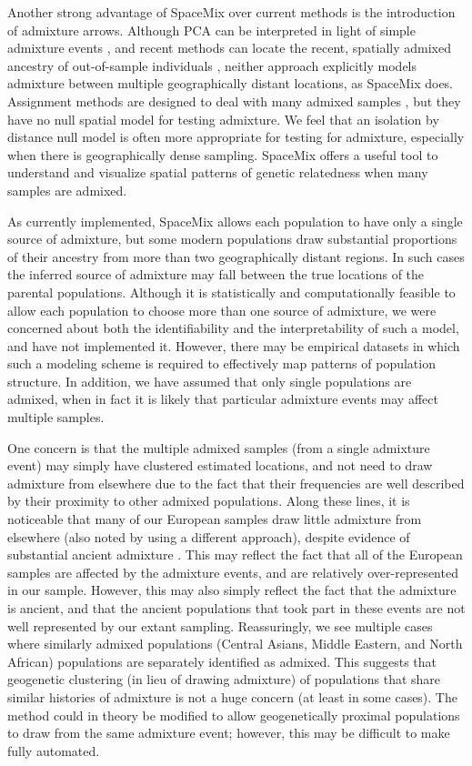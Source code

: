 \documentclass[10pt,letterpaper]{article}
\begin{document}
Another strong advantage of SpaceMix over current methods is the introduction of admixture arrows. 
Although PCA can be interpreted in light of simple admixture events \cite{mcvean_genealogical_2009}, 
and recent methods can locate the recent, spatially admixed ancestry of out-of-sample individuals \cite{yang_model-based_2012,yang_spatial_2014},
neither approach explicitly models admixture between multiple geographically distant locations,
as SpaceMix does.
Assignment methods are designed to deal with many admixed samples \cite{STRUCTURE}, 
but they have no null spatial model for testing admixture.
We feel that an isolation by distance null model is often more appropriate for testing for admixture, 
especially when there is geographically dense sampling. 
SpaceMix offers a useful tool to understand and visualize spatial patterns of genetic relatedness when many samples are admixed. 

As currently implemented, SpaceMix allows each population to have only a single source of admixture, 
but some modern populations draw substantial proportions of their ancestry from more than two geographically distant regions.
In such cases the inferred source of admixture may fall between the true locations of the parental populations.  
Although it is statistically and computationally feasible to allow each population to choose more than one source of admixture, 
we were concerned about both the identifiability and the interpretability of such a model, and have not implemented it.
However, there may be empirical datasets in which such a modeling scheme is required to effectively map patterns of population structure.
In addition, we have assumed that only single populations are admixed, when in fact it is likely that particular admixture events may affect multiple samples.

One concern is that the multiple admixed samples (from a single admixture event) may simply have clustered estimated locations, 
and not need to draw admixture from elsewhere due to the fact that their frequencies are well described by their proximity to other admixed populations.  
Along these lines, it is noticeable that many of our European samples draw little admixture from elsewhere (also noted by \cite{Hellenthal} using a different approach), 
despite evidence of substantial ancient admixture \cite{lazaridis_ancient_2014}.
This may reflect the fact that all of the European samples are affected by the admixture events, and are relatively over-represented in our sample. 
However, this may also simply reflect the fact that the admixture is ancient, 
and that the ancient populations that took part in these events are not well represented by our extant sampling. 
Reassuringly, we see multiple cases where similarly admixed populations (Central Asians, Middle Eastern, and North African) 
populations are separately identified as admixed. 
This suggests that geogenetic clustering (in lieu of drawing admixture) of populations that share similar histories of admixture is not a huge concern 
(at least in some cases). 
The method could in theory be modified to allow geogenetically proximal populations to draw from the same admixture event;
however, this may be difficult to make fully automated.
\end{document}
